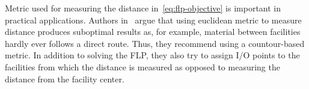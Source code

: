 Metric used for measuring the distance in~\ref{eq:flp-objective} is important in practical applications.
Authors in~\cite{friedrichIntegratedSlicingTree2018} argue that using euclidean metric
to measure distance produces suboptimal results as, for example, material between facilities
hardly ever follows a direct route. Thus, they recommend using a countour-based metric.
In addition to solving the FLP, they also try to assign I/O points to the facilities
from which the distance is measured as opposed to measuring the distance from the
facility center.









